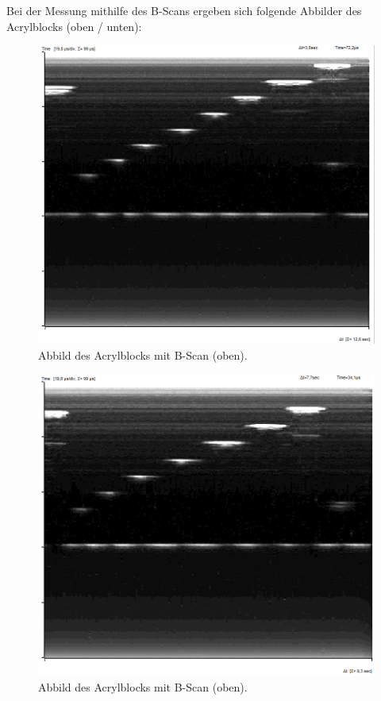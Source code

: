 Bei der Messung mithilfe des B-Scans ergeben sich folgende Abbilder des Acrylblocks (oben / unten):
 \begin{figure}[H]
		\centering
		\includegraphics[scale=0.4]{Auswertung/B-Mode.png}
		\caption{Abbild des Acrylblocks mit B-Scan (oben).}
		\label{fig:B1}
\end{figure}
\begin{figure}[H]
		\centering
		\includegraphics[scale=0.4]{Auswertung/B_Mode2.png}
		\caption{Abbild des Acrylblocks mit B-Scan (oben).}
		\label{fig:B2}
\end{figure}

